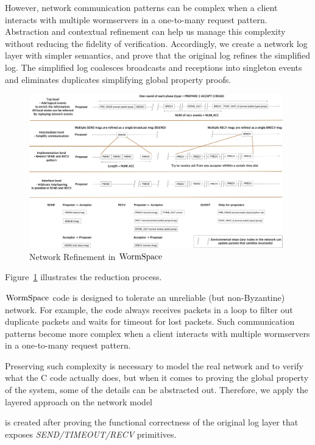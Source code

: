 However, network communication patterns can be complex when a client interacts with multiple wormservers in a one-to-many request pattern.
Abstraction and contextual refinement can help us manage this complexity without reducing the fidelity of verification.
Accordingly, we create a network log layer with simpler semantics, and prove that the original log refines the simplified log.
The simplified log coalesces broadcasts and receptions into singleton events and eliminates duplicates simplifying global property proofs.
\begin{figure}
\begin{center}
\includegraphics[width=0.98\textwidth]{figs/multipaxos/wormspace_network_refine}
\end{center}
\caption{Network Refinement in $\mathrm{WormSpace}$}
\label{fig:chapter:multipaxos:network-refinement}
\end{figure}
Figure~\ref{fig:chapter:multipaxos:network-refinement} illustrates the reduction process.


$\mathrm{WormSpace}$ code is designed to tolerate an unreliable (but non-Byzantine) network. For example, the code always receives packets in a loop to filter out duplicate packets and waits for timeout for lost packets. Such communication patterns become more complex when a client interacts with multiple wormservers in a one-to-many request pattern.

Preserving such complexity is necessary to model the real network and to verify what the C code actually does, but when it comes to proving the global property of the system, some of the details can be abstracted out.
Therefore, we apply the layered approach on the network model

is created after proving the functional correctness of the original log layer that exposes \textit{SEND/TIMEOUT/RECV} primitives.


